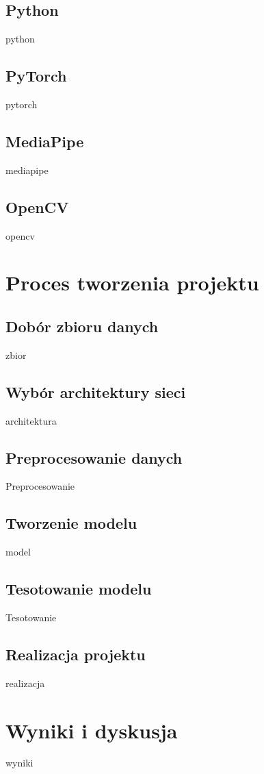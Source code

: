 \documentclass[12pt]{article}
\begin{document}
\begin{sloppypar}
{  \subsection{Python}
  {
    python
  }
  \subsection{PyTorch}
  {
    pytorch
  }
  \subsection{MediaPipe}
  {
    mediapipe
  
  }
  \subsection{OpenCV}
  {
    opencv
  }
}

\section{Proces tworzenia projektu}
{
  \subsection{Dobór zbioru danych}
  {
    zbior
  }
  \subsection{Wybór architektury sieci}
  {
    architektura
  }
  \subsection{Preprocesowanie danych}
  {
    Preprocesowanie
  }
  \subsection{Tworzenie modelu}
  {
    model
  }
  \subsection{Tesotowanie modelu}
  {
    Tesotowanie
  }
  \subsection{Realizacja projektu}
  {
    realizacja
  }
}

\section{Wyniki i dyskusja}
{
  wyniki
}


\end{sloppypar}
\end{document}
